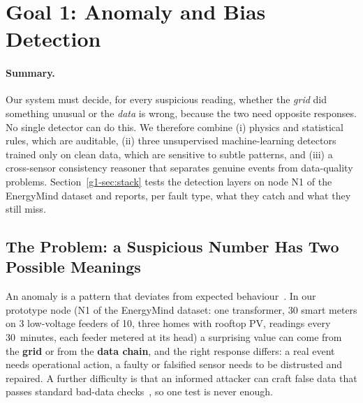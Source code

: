 \section{Goal 1: Anomaly and Bias Detection}
\label{g1-sec:goal1}
\paragraph{Summary.} Our system must decide, for every suspicious reading, whether the \emph{grid}
did something unusual or the \emph{data} is wrong, because the two need opposite responses. No single
detector can do this. We therefore combine (i) physics and statistical rules, which are auditable,
(ii) three unsupervised machine-learning detectors trained only on clean data, which are sensitive to subtle
patterns, and (iii) a cross-sensor consistency reasoner that separates genuine events from data-quality
problems. Section~\ref{g1-sec:stack} tests the detection layers on node N1 of the EnergyMind dataset and
reports, per fault type, what they catch and what they still miss.

\subsection{The Problem: a Suspicious Number Has Two Possible Meanings}
\label{g1-sec:problem}
An anomaly is a pattern that deviates from expected behaviour~\cite{chandola}. In our prototype node (N1 of
the EnergyMind dataset: one transformer, 30 smart meters on 3 low-voltage feeders of 10, three homes with
rooftop PV, readings every 30~minutes, each feeder metered at its head) a surprising value can come from the
\textbf{grid} or from
the \textbf{data chain}, and the right response differs: a real event needs operational action, a faulty or
falsified sensor needs to be distrusted and repaired. A further difficulty is that an informed attacker can
craft false data that passes standard bad-data checks~\cite{fdi}, so one test is never enough.

